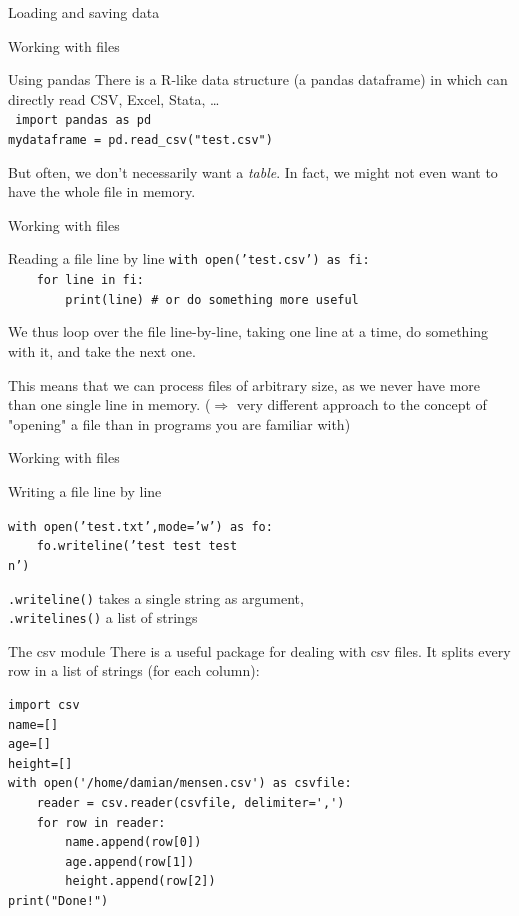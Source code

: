 \documentclass{beamer}
\begin{document}
\begin{frame}[plain]
	Loading and saving data
\end{frame}


\begin{frame}{Working with files}
\begin{block}{Using pandas}
There is a R-like data structure (a pandas dataframe) in which can directly read CSV, Excel, Stata, \ldots \\
\texttt{
import pandas as pd\\
mydataframe = pd.read\_csv("test.csv")}
\end{block}
But often, we don't necessarily want a \emph{table}. In fact, we might not even want to have the whole file in memory.
\end{frame}



\begin{frame}{Working with files}
	\begin{block}{Reading a file line by line}
\texttt{with open('test.csv') as fi: \\
~~~~for line in fi: \\
~~~~~~~~print(line) \# or do something more useful}
	\end{block}
We thus loop over the file line-by-line, taking one line at a time, do something with it, and take the next one.

This means that we can process files of arbitrary size, as we never have more than one single line in memory. ($\Rightarrow$ very different approach to the concept of "opening" a file than in programs you are familiar with)

\end{frame}



\begin{frame}{Working with files}
	\begin{block}{Writing a file line by line}
		
		\texttt{with open('test.txt',mode='w') as fo: \\
			~~~~fo.writeline('test test test\\n')}
	\end{block}
\texttt{.writeline()} takes a single string as argument,\\ \texttt{.writelines()} a list of strings
	
\end{frame}



\begin{frame}[fragile]{The csv module}
There is a useful package for dealing with csv files. It splits every row in a list of strings (for each column):

\begin{lstlisting}
import csv
name=[]
age=[]
height=[]
with open('/home/damian/mensen.csv') as csvfile:
    reader = csv.reader(csvfile, delimiter=',')
    for row in reader:
        name.append(row[0])
        age.append(row[1])
        height.append(row[2])
print("Done!")
\end{lstlisting}

\end{frame}
\end{document}
